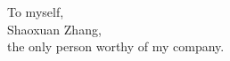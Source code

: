 
\begin{dedication}
\null\vfil
{\large
\begin{center}
To myself,\\\vspace{12pt}
Shaoxuan Zhang,\\\vspace{12pt}
the only person worthy of my company.
\end{center}}
\vfil\null
\end{dedication}
